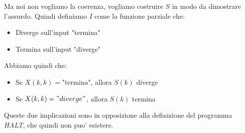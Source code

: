 Ma noi non vogliamo la coerenza, vogliamo costruire $ S  $ in modo da dimostrare l'assurdo. Quindi definiamo $ I $ come la funzione parziale che:
\begin{itemize}
\item Diverge sull'input "termina"
\item Termina sull'input "diverge"
\end{itemize}

Abbiamo quindi che:

\begin{itemize}
  \item Se $ X(k,k) = \text{"termina"} $, allora $ S(k) $ diverge
  \item Se $ X(k,k) = "diverge" $, allora $ S(k) $ termina
\end{itemize}

Queste due implicazioni sono in opposizione alla definizione del programma \textit{HALT}, che quindi non puo' esistere.


